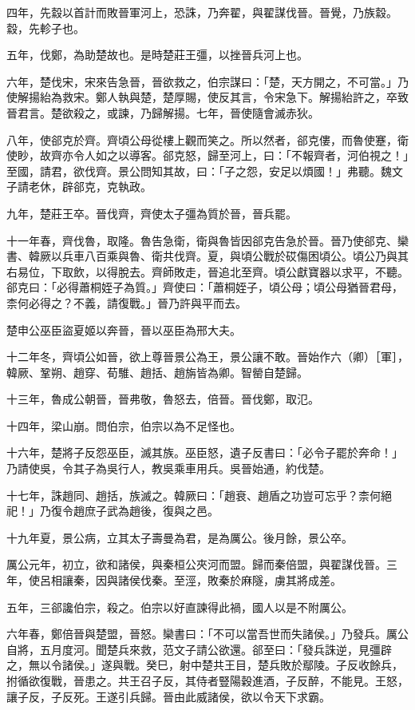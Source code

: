 \begin{pinyinscope}
四年，先縠以首計而敗晉軍河上，恐誅，乃奔翟，與翟謀伐晉。晉覺，乃族縠。縠，先軫子也。

五年，伐鄭，為助楚故也。是時楚莊王彊，以挫晉兵河上也。

六年，楚伐宋，宋來告急晉，晉欲救之，伯宗謀曰：「楚，天方開之，不可當。」乃使解揚紿為救宋。鄭人執與楚，楚厚賜，使反其言，令宋急下。解揚紿許之，卒致晉君言。楚欲殺之，或諫，乃歸解揚。七年，晉使隨會滅赤狄。

八年，使郤克於齊。齊頃公母從樓上觀而笑之。所以然者，郤克僂，而魯使蹇，衛使眇，故齊亦令人如之以導客。郤克怒，歸至河上，曰：「不報齊者，河伯視之！」至國，請君，欲伐齊。景公問知其故，曰：「子之怨，安足以煩國！」弗聽。魏文子請老休，辟郤克，克執政。

九年，楚莊王卒。晉伐齊，齊使太子彊為質於晉，晉兵罷。

十一年春，齊伐魯，取隆。魯告急衛，衛與魯皆因郤克告急於晉。晉乃使郤克、欒書、韓厥以兵車八百乘與魯、衛共伐齊。夏，與頃公戰於砹傷困頃公。頃公乃與其右易位，下取飲，以得脫去。齊師敗走，晉追北至齊。頃公獻寶器以求平，不聽。郤克曰：「必得蕭桐姪子為質。」齊使曰：「蕭桐姪子，頃公母；頃公母猶晉君母，柰何必得之？不義，請復戰。」晉乃許與平而去。

楚申公巫臣盜夏姬以奔晉，晉以巫臣為邢大夫。

十二年冬，齊頃公如晉，欲上尊晉景公為王，景公讓不敢。晉始作六（卿）［軍］，韓厥、鞏朔、趙穿、荀騅、趙括、趙旃皆為卿。智罃自楚歸。

十三年，魯成公朝晉，晉弗敬，魯怒去，倍晉。晉伐鄭，取氾。

十四年，梁山崩。問伯宗，伯宗以為不足怪也。

十六年，楚將子反怨巫臣，滅其族。巫臣怒，遺子反書曰：「必令子罷於奔命！」乃請使吳，令其子為吳行人，教吳乘車用兵。吳晉始通，約伐楚。

十七年，誅趙同、趙括，族滅之。韓厥曰：「趙衰、趙盾之功豈可忘乎？柰何絕祀！」乃復令趙庶子武為趙後，復與之邑。

十九年夏，景公病，立其太子壽曼為君，是為厲公。後月餘，景公卒。

厲公元年，初立，欲和諸侯，與秦桓公夾河而盟。歸而秦倍盟，與翟謀伐晉。三年，使呂相讓秦，因與諸侯伐秦。至涇，敗秦於麻隧，虜其將成差。

五年，三郤讒伯宗，殺之。伯宗以好直諫得此禍，國人以是不附厲公。

六年春，鄭倍晉與楚盟，晉怒。欒書曰：「不可以當吾世而失諸侯。」乃發兵。厲公自將，五月度河。聞楚兵來救，范文子請公欲還。郤至曰：「發兵誅逆，見彊辟之，無以令諸侯。」遂與戰。癸巳，射中楚共王目，楚兵敗於鄢陵。子反收餘兵，拊循欲復戰，晉患之。共王召子反，其侍者豎陽穀進酒，子反醉，不能見。王怒，讓子反，子反死。王遂引兵歸。晉由此威諸侯，欲以令天下求霸。


\end{pinyinscope}
